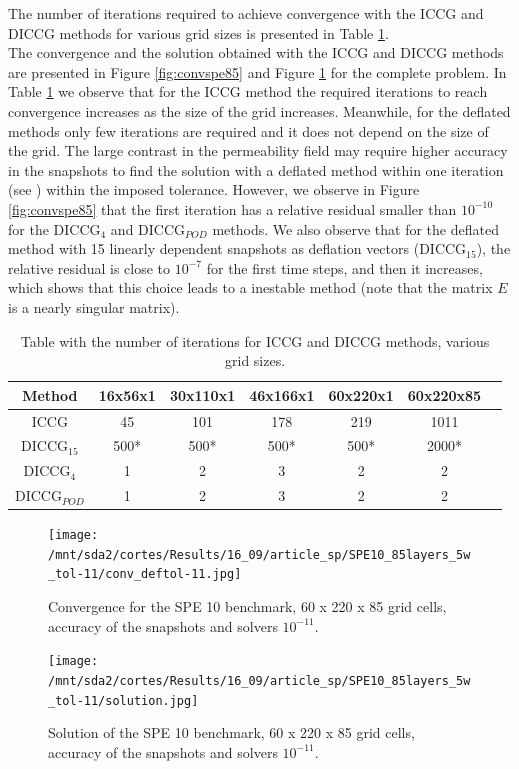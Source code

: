 \documentclass[12pt]{article}
\begin{document}
The number of iterations required to achieve convergence with the ICCG and DICCG methods for various grid sizes is presented in Table \ref{table:itgrid}. \\
The convergence and the solution obtained with the ICCG and DICCG methods are presented in Figure \ref{fig:convspe85} and Figure \ref{fig:solspe} for the complete problem. 
In Table \ref{table:itgrid} we observe that for the ICCG method the required iterations to reach convergence increases as the size of the grid increases. Meanwhile, for the deflated methods only few iterations are required and it does not depend on the size of the grid. The large contrast in the permeability field may require higher accuracy in the snapshots to find the solution with a deflated method within one iteration (see \cite{Diaz16}) within the imposed tolerance. However, we observe in Figure \ref{fig:convspe85} that the first iteration has a relative residual smaller than $10^{-10}$ for the DICCG$_4$ and DICCG$_{POD}$ methods.
We also observe that for the deflated method with 15 linearly dependent snapshots as deflation vectors (DICCG$_{15}$), the relative residual is close to $10^{-7}$ for the first time steps, and then it increases, which shows that this choice leads to a inestable method (note that the matrix $E$ is a nearly singular matrix). 

\begin{table}[!ht]
\centering
\begin{tabular}{|c |c|c|c|c|c| c| } 
 \hline
Method  & 16x56x1& 30x110x1& 46x166x1& 60x220x1&60x220x85\\
   \hline
  ICCG & 45 & 101&  178 &  219&1011 \\ 
   DICCG$_{15}$ & 500* & 500*&  500* &  500*& 2000*\\ 
   DICCG$_{4}$ & 1 & 2&  3 &  2& 2\\  
   DICCG$_{POD}$ & 1 & 2&  3 &  2 &2\\ 
\hline
\end{tabular}
\caption{Table with the number of iterations for ICCG and DICCG methods, 
various grid sizes.}
\label{table:itgrid}
\end{table}

\begin{figure}[!h]
\centering
\begin{minipage}{.5\textwidth}
 \centering
\texttt{[image: /mnt/sda2/cortes/Results/16\_09/article\_sp/SPE10\_85layers\_5w\_tol-11/conv\_deftol-11.jpg]}
\caption{Convergence for the SPE 10 benchmark, 60 x 220 x 85 grid cells, accuracy of the snapshots and solvers $10 ^{-11}$.}
\label{fig:convspe85}
\end{minipage}%
\hspace{3mm}
\begin{minipage}{.45\textwidth}
 \centering
\texttt{[image: /mnt/sda2/cortes/Results/16\_09/article\_sp/SPE10\_85layers\_5w\_tol-11/solution.jpg]}
\vspace{.7cm}
\caption{Solution of the SPE 10 benchmark, 60 x 220 x 85 grid cells, accuracy of the snapshots and solvers $10 ^{-11}$.}
\label{fig:solspe}
\end{minipage}
\end{figure}
\clearpage 
\end{document}
